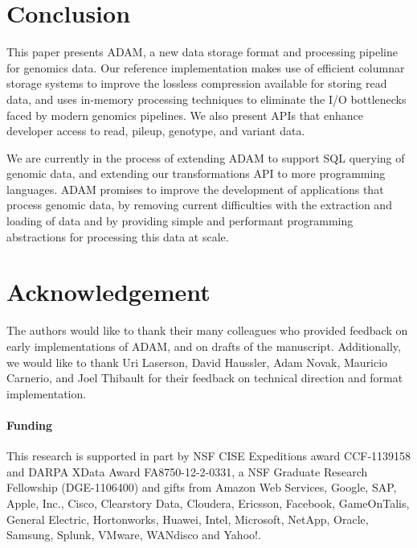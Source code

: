 \documentclass{bioinfo}
\begin{document}
\section{Conclusion}
\label{sec:conclusion}

This paper presents ADAM, a new data storage format and processing pipeline for genomics data. Our reference implementation makes use of efficient columnar storage
systems to improve the lossless compression available for storing read data, and uses in-memory processing techniques to eliminate the I/O bottlenecks faced by
modern genomics pipelines. We also present APIs that enhance developer access to read, pileup, genotype, and variant data.

We are currently in the process of extending ADAM to support SQL querying of genomic data, and extending our transformations API to more programming languages. 
ADAM promises to improve the development of applications that process genomic data, by removing current difficulties with the extraction and loading of data and by
providing simple and performant programming abstractions for processing this data at scale.

\section*{Acknowledgement}
\label{sec:acknowledgement}

The authors would like to thank their many colleagues who provided feedback on early implementations of ADAM, and on drafts of the manuscript. Additionally, we would
like to thank Uri Laserson, David Haussler, Adam Novak, Mauricio Carnerio, and Joel Thibault for their feedback on technical direction and format implementation.

\paragraph{Funding\textcolon}
\label{sec:funding}

This research is supported in part by NSF CISE Expeditions award CCF-1139158 and DARPA XData Award FA8750-12-2-0331, a NSF
Graduate Research Fellowship (DGE-1106400) and gifts from Amazon Web Services, Google, SAP,  Apple, Inc., Cisco, Clearstory Data,
Cloudera, Ericsson, Facebook, GameOnTalis, General Electric, Hortonworks, Huawei, Intel, Microsoft, NetApp, Oracle, Samsung, Splunk,
VMware, WANdisco and Yahoo!.




\end{document}
